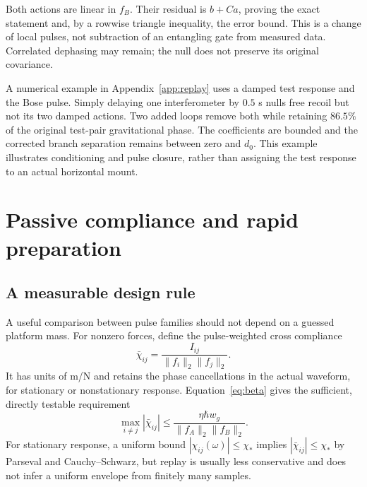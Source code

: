 \documentclass[aps,pra,reprint,amsmath,amssymb,longbibliography,floatfix]{revtex4-2}
\newcommand{\norm}[1]{\lVert#1\rVert}
\begin{document}
Both actions are linear in $f_B$. Their residual is $b+Ca$, proving the exact statement and, by a rowwise triangle inequality, the error bound. This is a change of local pulses, not subtraction of an entangling gate from measured data. Correlated dephasing may remain; the null does not preserve its original covariance.

A numerical example in Appendix~\ref{app:replay} uses a damped test response and the Bose pulse. Simply delaying one interferometer by $0.5$ s nulls free recoil but not its two damped actions. Two added loops remove both while retaining $86.5\%$ of the original test-pair gravitational phase. The coefficients are bounded and the corrected branch separation remains between zero and $d_0$. This example illustrates conditioning and pulse closure, rather than assigning the test response to an actual horizontal mount.

\section{Passive compliance and rapid preparation}
\subsection{A measurable design rule}
A useful comparison between pulse families should not depend on a guessed platform mass. For nonzero forces, define the pulse-weighted cross compliance
\begin{equation}
\bar\chi_{ij}=\frac{I_{ij}}{\norm{f_i}_2\norm{f_j}_2}.
\label{eq:weightedchi}
\end{equation}
It has units of m/N and retains the phase cancellations in the actual waveform, for stationary or nonstationary response. Equation~\eqref{eq:beta} gives the sufficient, directly testable requirement
\begin{equation}
\max_{i\ne j}|\bar\chi_{ij}|\le\frac{\eta\hbar w_g}{\norm{f_A}_2\norm{f_B}_2}.
\label{eq:budget}
\end{equation}
For stationary response, a uniform bound $|\chi_{ij}(\omega)|\le\chi_*$ implies $|\bar\chi_{ij}|\le\chi_*$ by Parseval and Cauchy--Schwarz, but replay is usually less conservative and does not infer a uniform envelope from finitely many samples.
\end{document}
